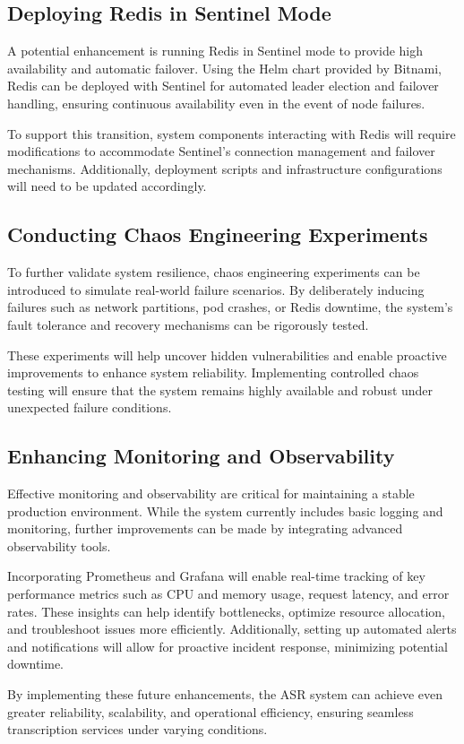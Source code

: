\subsection{Deploying Redis in Sentinel Mode}

A potential enhancement is running Redis in Sentinel mode to provide high availability and automatic failover. Using the Helm chart provided by Bitnami, Redis can be deployed with Sentinel for automated leader election and failover handling, ensuring continuous availability even in the event of node failures.  

To support this transition, system components interacting with Redis will require modifications to accommodate Sentinel’s connection management and failover mechanisms. Additionally, deployment scripts and infrastructure configurations will need to be updated accordingly.  

\subsection{Conducting Chaos Engineering Experiments}

To further validate system resilience, chaos engineering experiments can be introduced to simulate real-world failure scenarios. By deliberately inducing failures such as network partitions, pod crashes, or Redis downtime, the system’s fault tolerance and recovery mechanisms can be rigorously tested.  

These experiments will help uncover hidden vulnerabilities and enable proactive improvements to enhance system reliability. Implementing controlled chaos testing will ensure that the system remains highly available and robust under unexpected failure conditions.  

\subsection{Enhancing Monitoring and Observability}

Effective monitoring and observability are critical for maintaining a stable production environment. While the system currently includes basic logging and monitoring, further improvements can be made by integrating advanced observability tools.  

Incorporating Prometheus and Grafana will enable real-time tracking of key performance metrics such as CPU and memory usage, request latency, and error rates. These insights can help identify bottlenecks, optimize resource allocation, and troubleshoot issues more efficiently. Additionally, setting up automated alerts and notifications will allow for proactive incident response, minimizing potential downtime.  

By implementing these future enhancements, the ASR system can achieve even greater reliability, scalability, and operational efficiency, ensuring seamless transcription services under varying conditions.
